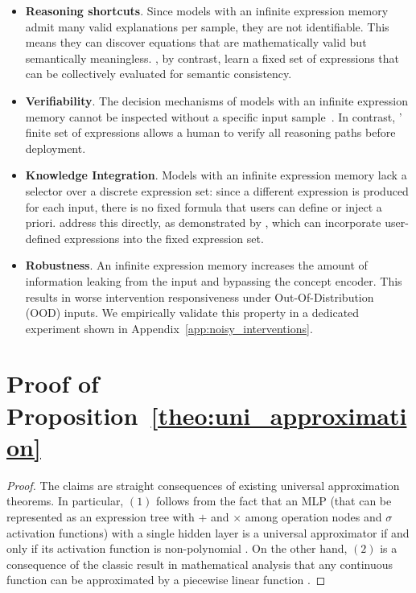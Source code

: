 \documentclass{article}
\theoremstyle{plain}
\theoremstyle{definition}
\theoremstyle{remark}
\begin{document}
\begin{itemize}
    \item \textbf{Reasoning shortcuts}. Since models with an infinite expression memory admit many valid explanations per sample, they are not identifiable. This means they can discover equations that are mathematically valid but semantically meaningless. \classacro{}, by contrast, learn a fixed set of expressions that can be collectively evaluated for semantic consistency.
    \item \textbf{Verifiability}. The decision mechanisms of models with an infinite expression memory cannot be inspected without a specific input sample~\citep{debot2024interpretable}. In contrast, \classacro{}' finite set of expressions allows a human to verify all reasoning paths before deployment.
    \item \textbf{Knowledge Integration}. Models with an infinite expression memory lack a selector over a discrete expression set: since a different expression is produced for each input, there is no fixed formula that users can define or inject a priori. \classacro{} address this directly, as demonstrated by \prior{}, which can incorporate user-defined expressions into the fixed expression set.
    \item \textbf{Robustness}. An infinite expression memory increases the amount of information leaking from the input and bypassing the concept encoder. This results in worse intervention responsiveness under Out-Of-Distribution (OOD) inputs. We empirically validate this property in a dedicated experiment shown in Appendix~\ref{app:noisy_interventions}.
\end{itemize}


\section{Proof of Proposition~\ref{theo:uni_approximation}}
\label{app:uni_approximation}
\begin{proof}
    The claims are straight consequences of existing universal approximation theorems. In particular, $(1)$ follows from the fact that an MLP (that can be represented as an expression tree with $+$ and $\times$ among operation nodes and $\sigma$ activation functions) with a single hidden layer is a universal approximator if and only if its activation function is non-polynomial \citep{leshno1993multilayer}. On the other hand, $(2)$ is a consequence of the classic result in mathematical analysis that any continuous function can be approximated by a piecewise linear function     \cite{schumaker2007spline}.
\end{proof}
\end{document}
